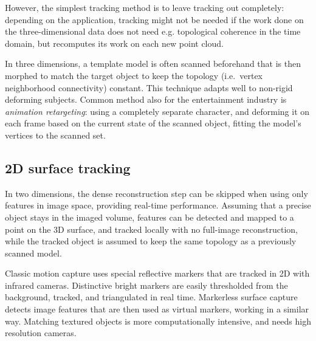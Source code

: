 However, the simplest tracking method is to leave tracking out completely: depending on the application, tracking might not be needed if the work done on the three-dimensional data does not need e.g. topological coherence in the time domain, but recomputes its work on each new point cloud.


In three dimensions, a template model is often scanned beforehand that is then morphed to match the target object to keep the topology (i.e.~vertex neighborhood connectivity) constant.
This technique adapts well to non-rigid deforming subjects. \cite{bojsen2012tracking,li2009robust}
Common method also for the entertainment industry is \emph{animation retargeting}: using a completely separate character, and deforming it on each frame based on the current state of the scanned object, fitting the model's vertices to the scanned set.


\subsection{2D surface tracking} %


In two dimensions, the dense reconstruction step can be skipped when using only features in image space, providing real-time performance. \cite{pilet2005real}
Assuming that a precise object stays in the imaged volume, features can be detected and mapped to a point on the 3D surface, and tracked locally with no full-image reconstruction, while the tracked object is assumed to keep the same topology as a previously scanned model.


Classic motion capture uses special reflective markers that are tracked in 2D with infrared cameras.
Distinctive bright markers are easily thresholded from the background, tracked, and triangulated in real time.
Markerless surface capture detects image features that are then used as virtual markers, working in a similar way.
Matching textured objects is more computationally intensive, and needs high resolution cameras.

